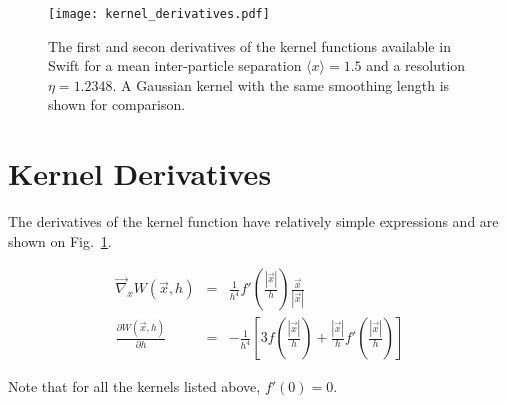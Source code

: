 \documentclass[a4paper]{mnras}
\newcommand{\swift}{{\sc Swift}\xspace}
\begin{document}
\begin{figure}
\texttt{[image: kernel\_derivatives.pdf]}
\caption{The first and secon derivatives of the kernel functions
  available in \swift for a mean inter-particle separation $\langle
  x\rangle=1.5$ and a resolution $\eta=1.2348$.  A Gaussian kernel
  with the same smoothing length is shown for comparison.}
\label{fig:sph:kernel_derivatives}
\end{figure}


\section{Kernel Derivatives}

The derivatives of the kernel function have relatively simple
expressions and are shown on Fig.~\ref{fig:sph:kernel_derivatives}.

\begin{eqnarray*}
 \vec\nabla_x W(\vec{x},h) &=& \frac{1}{h^4}f'\left(\frac{|\vec{x}|}{h}\right) \frac{\vec{x}}{|\vec{x}|} \\
 \frac{\partial W(\vec{x},h)}{\partial h} &=&- \frac{1}{h^4}\left[3f\left(\frac{|\vec{x}|}{h}\right) + 
\frac{|\vec{x}|}{h}f'\left(\frac{|\vec{x}|}{h}\right)\right]
\end{eqnarray*}

Note that for all the kernels listed above, $f'(0) = 0$. 
\end{document}
